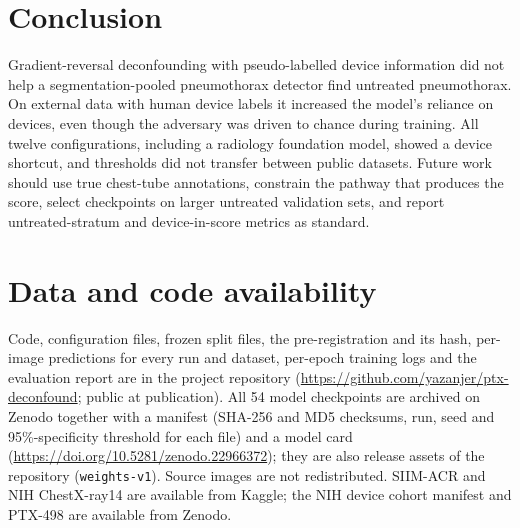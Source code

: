 \documentclass[final,3p]{elsarticle}
\begin{document}
\section{Conclusion}
\label{sec:conclusion}
Gradient-reversal deconfounding with pseudo-labelled device information did not help a segmentation-pooled pneumothorax detector find untreated pneumothorax. On external data with human device labels it increased the model's reliance on devices, even though the adversary was driven to chance during training. All twelve configurations, including a radiology foundation model, showed a device shortcut, and thresholds did not transfer between public datasets. Future work should use true chest-tube annotations, constrain the pathway that produces the score, select checkpoints on larger untreated validation sets, and report untreated-stratum and device-in-score metrics as standard.

\section*{Data and code availability}
Code, configuration files, frozen split files, the pre-registration and its hash, per-image predictions for every run and dataset, per-epoch training logs and the evaluation report are in the project repository (\url{https://github.com/yazanjer/ptx-deconfound}; public at publication). All 54 model checkpoints are archived on Zenodo together with a manifest (SHA-256 and MD5 checksums, run, seed and 95\%-specificity threshold for each file) and a model card (\url{https://doi.org/10.5281/zenodo.22966372}); they are also release assets of the repository (\texttt{weights-v1}). Source images are not redistributed. SIIM-ACR and NIH ChestX-ray14 are available from Kaggle; the NIH device cohort manifest \citep{zamora2026cohort} and PTX-498 \citep{wang2021ptx498} are available from Zenodo.
\end{document}
